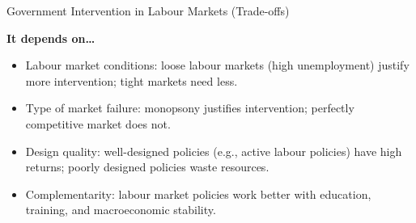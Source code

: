 \documentclass[11pt, a4paper, twoside]{book}
\begin{document}
\begin{evaluation}{Government Intervention in Labour Markets (Trade-offs)}
\begin{itemize}[leftmargin=*, nosep]
\end{itemize}
\textbf{It depends on\ldots}
\begin{itemize}[leftmargin=*, nosep]
\item Labour market conditions: loose labour markets (high unemployment) justify more intervention; tight markets need less.
\item Type of market failure: monopsony justifies intervention; perfectly competitive market does not.
\item Design quality: well-designed policies (e.g., active labour policies) have high returns; poorly designed policies waste resources.
\item Complementarity: labour market policies work better with education, training, and macroeconomic stability.
\end{itemize}
\end{evaluation}
\end{document}
